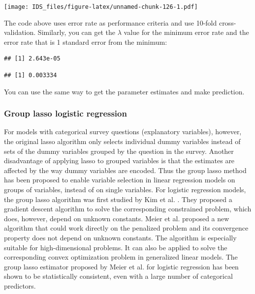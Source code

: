 \documentclass[
  12pt,
]{krantz}
\makeatletter
\newenvironment{Shaded}{\begin{snugshade}}{\end{snugshade}}
\newcommand{\FloatTok}[1]{\textcolor[rgb]{0.06,0.06,0.06}{#1}}
\newcommand{\NormalTok}[1]{#1}
\newcommand{\SpecialCharTok}[1]{\textcolor[rgb]{0,0,0}{#1}}
\newenvironment{kframe}{%
\medskip{}
\setlength{\fboxsep}{.8em}
 \def\at@end@of@kframe{}%
 \ifinner\ifhmode%
  \def\at@end@of@kframe{\end{minipage}}%
  \begin{minipage}{\columnwidth}%
 \fi\fi%
 \def\FrameCommand##1{\hskip\@totalleftmargin \hskip-\fboxsep
 \colorbox{shadecolor}{##1}\hskip-\fboxsep
     \hskip-\linewidth \hskip-\@totalleftmargin \hskip\columnwidth}%
 \MakeFramed {\advance\hsize-\width
   \@totalleftmargin\z@ \linewidth\hsize
   \@setminipage}}%
 {\par\unskip\endMakeFramed%
 \at@end@of@kframe}
\renewenvironment{Shaded}{\begin{kframe}}{\end{kframe}}
\makeatother
\begin{document}
\texttt{[image: IDS\_files/figure-latex/unnamed-chunk-126-1.pdf]}

The code above uses error rate as performance criteria and use 10-fold cross-validation. Similarly, you can get the \(\lambda\) value for the minimum error rate and the error rate that is 1 standard error from the minimum:

\begin{Shaded}
\end{Shaded}

\begin{verbatim}
## [1] 2.643e-05
\end{verbatim}

\begin{Shaded}
\end{Shaded}

\begin{verbatim}
## [1] 0.003334
\end{verbatim}

You can use the same way to get the parameter estimates and make prediction.

\hypertarget{group-lasso-logistic-regression}{%
\subsubsection{Group lasso logistic regression}\label{group-lasso-logistic-regression}}

For models with categorical survey questions (explanatory variables), however, the original lasso algorithm only selects individual dummy variables instead of sets of the dummy variables grouped by the question in the survey. Another disadvantage of applying lasso to grouped variables is that the estimates are affected by the way dummy variables are encoded. Thus the group lasso \citep{Yuan2007} method has been proposed to enable variable selection in linear regression models on groups of variables, instead of on single variables. For logistic regression models, the group lasso algorithm was first studied by Kim et al. \citep{Kim2006}. They proposed a gradient descent algorithm to solve the corresponding constrained problem, which does, however, depend on unknown constants. Meier et al. \citep{Meier2008} proposed a new algorithm that could work directly on the penalized problem and its convergence property does not depend on unknown constants. The algorithm is especially suitable for high-dimensional problems. It can also be applied to solve the corresponding convex optimization problem in generalized linear models. The group lasso estimator proposed by Meier et al. \citep{Meier2008} for logistic regression has been shown to be statistically consistent, even with a large number of categorical predictors.
\end{document}
